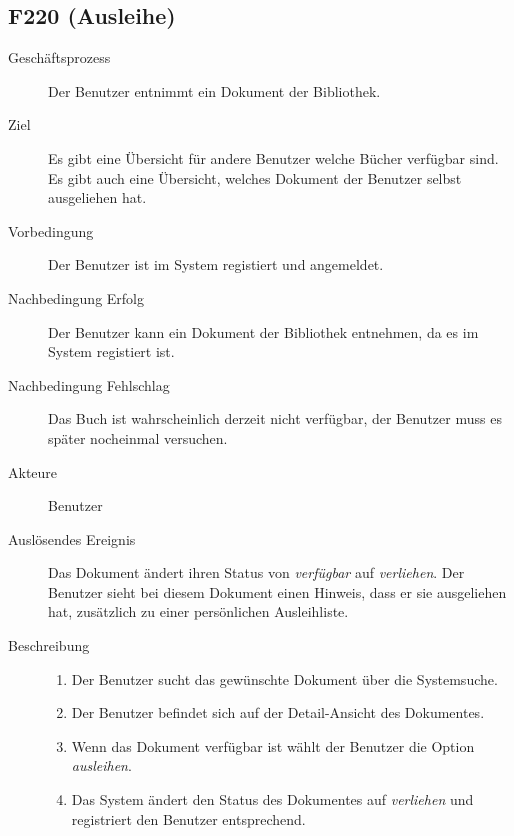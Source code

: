 \subsection{F220 (Ausleihe)}
\begin{description}
  \item[Geschäftsprozess]Der Benutzer entnimmt ein Dokument der Bibliothek.
  \item[Ziel]Es gibt eine Übersicht für andere Benutzer welche Bücher verfügbar sind. Es gibt auch eine Übersicht, welches Dokument der Benutzer selbst ausgeliehen hat.
  \item[Vorbedingung]Der Benutzer ist im System registiert und angemeldet.
  \item[Nachbedingung Erfolg]Der Benutzer kann ein Dokument der Bibliothek entnehmen, da es im System registiert ist.
  \item[Nachbedingung Fehlschlag]Das Buch ist wahrscheinlich derzeit nicht verfügbar, der Benutzer muss es später nocheinmal versuchen.
  \item[Akteure]Benutzer
  \item[Auslösendes Ereignis]Das Dokument ändert ihren Status von \emph{verfügbar} auf \emph{verliehen}. Der Benutzer sieht bei diesem Dokument einen Hinweis, dass er sie ausgeliehen hat, zusätzlich zu einer persönlichen Ausleihliste.
  \item[Beschreibung]\hfill
    \begin{enumerate}
      \item Der Benutzer sucht das gewünschte Dokument über die Systemsuche.
      \item Der Benutzer befindet sich auf der Detail-Ansicht des Dokumentes.
      \item Wenn das Dokument verfügbar ist wählt der Benutzer die Option \emph{ausleihen}.
      \item Das System ändert den Status des Dokumentes auf \emph{verliehen} und registriert den Benutzer entsprechend.
    \end{enumerate}
\end{description}

